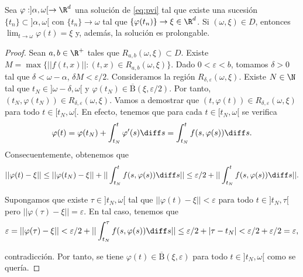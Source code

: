 \documentclass{article}
\begin{document}
\begin{lemma}\label{lem:prolongacion}
  Sea $\varphi : ]\alpha, \omega[ \to \R^d$ una solución de \eqref{eq:pvi} tal que existe una
  sucesión $\{t_n\} \subset ]\alpha, \omega[$ con $\{t_n\} \to \omega$ tal que
  $\{\varphi(t_n)\} \to \xi \in \R^d$. Si $(\omega, \xi) \in D$, entonces
  $\lim_{t \to \omega} \varphi(t) = \xi$ y, además, la solución es prolongable.
\end{lemma}
\begin{proof}
  Sean $a, b \in \R^+$ tales que $R_{a,b}(\omega, \xi) \subset D$. Existe
  $M = \max \{||f(t,x)||: (t,x) \in R_{a,b}(\omega, \xi)\}$. Dado $0 < \varepsilon < b$, tomamos
  $\delta > 0$ tal que $\delta < \omega - \alpha$, $\delta M < \varepsilon / 2$. Consideramos la
  región $R_{\delta, \varepsilon}(\omega, \xi)$. Existe $N \in \N$ tal que
  $t_N \in ]\omega-\delta, \omega[$ y $\varphi(t_N) \in \overline{\mathrm{B}}(\xi,
  \varepsilon/2)$. Por tanto, $(t_N, \varphi(t_N)) \in R_{\delta, \varepsilon}(\omega, \xi)$. Vamos
  a demostrar que $(t, \varphi(t)) \in R_{\delta, \varepsilon}(\omega, \xi)$ para todo
  $t \in [t_N, \omega[$. En efecto, tenemos que para cada $t \in [t_N, \omega[$ se verifica
  \[\varphi(t) = \varphi(t_N) + \int_{t_N}^{t} \varphi'(s) \diff s = \int_{t_N}^{t}
    f(s,\varphi(s)) \diff s.\] Consecuentemente, obtenemos que
  \[||\varphi(t)-\xi|| \le ||\varphi(t_N) - \xi|| + ||\int_{t_N}^{t} f(s,\varphi(s)) \diff
    s|| \le \varepsilon / 2 + ||\int_{t_N}^{t} f(s,\varphi(s)) \diff s||.\]

  Supongamos que existe $\tau \in ]t_N, \omega[$ tal que $||\varphi(t) - \xi|| < \varepsilon$ para
  todo $t \in ]t_N, \tau[$ pero $||\varphi(\tau) - \xi|| = \varepsilon$. En tal caso, tenemos que
  \[\varepsilon = ||\varphi(\tau) - \xi|| < \varepsilon / 2 + ||\int_{t_N}^{\tau}
    f(s,\varphi(s)) \diff s|| \le \varepsilon / 2 + |\tau - t_N| < \varepsilon/2 + \varepsilon/2 =
    \varepsilon,\]

  contradicción. Por tanto, se tiene $\varphi(t) \in \overline{\mathrm{B}}(\xi, \varepsilon)$ para
  todo $t \in ]t_N, \omega[$ como se quería.
\end{proof}
\end{document}
